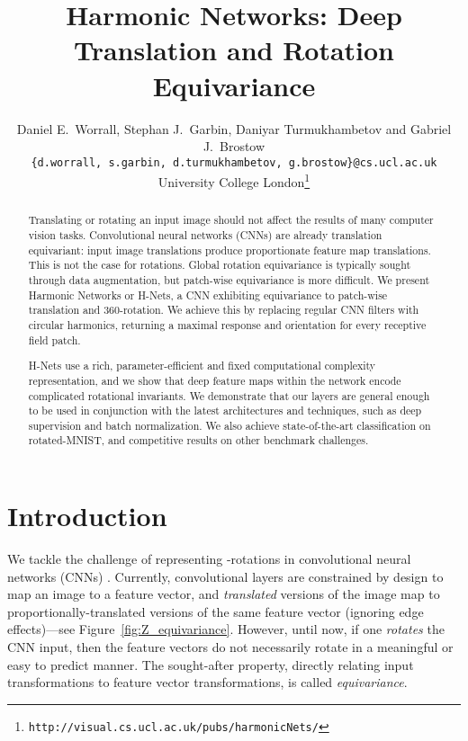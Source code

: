 \documentclass[10pt,twocolumn,letterpaper]{article}
\begin{document}
\title{Harmonic Networks: Deep Translation and Rotation Equivariance}

\author{Daniel E.~Worrall, Stephan J.~Garbin, Daniyar Turmukhambetov and Gabriel J.~Brostow \\
{\tt \small \{{d.worrall}, {s.garbin}, {d.turmukhambetov}, {g.brostow}\}{@cs.ucl.ac.uk}}\\
University College London\thanks{\texttt{http://visual.cs.ucl.ac.uk/pubs/harmonicNets/}}}


\maketitle


\begin{abstract}
	Translating or rotating an input image should not affect the results 
    of many computer vision tasks. Convolutional neural networks (CNNs) 
    are already translation equivariant: input image translations produce 
    proportionate feature map translations. This is not the case for 
    rotations. Global rotation equivariance is typically sought through 
    data augmentation, but patch-wise equivariance is more difficult. 
    We present Harmonic Networks or H-Nets, a CNN exhibiting equivariance 
    to patch-wise translation and 360-rotation. We achieve this by replacing 
    regular CNN filters with circular harmonics, returning a maximal 
    response and orientation for every receptive field patch.
    
    H-Nets use a rich, parameter-efficient and fixed computational complexity 
    representation, and we show that deep feature maps within the network 
    encode complicated rotational invariants. We demonstrate that our layers 
    are general enough to be used in conjunction with the latest architectures 
    and techniques, such as deep supervision and batch normalization. We also 
    achieve state-of-the-art classification on rotated-MNIST, and competitive 
    results on other benchmark challenges.
\end{abstract}



\section{Introduction}
We tackle the challenge of representing -rotations in convolutional neural networks (CNNs) \cite{lecun1995cnn}. Currently, convolutional layers are constrained by design to map an image to a feature vector, and \emph{translated} versions of the image map to proportionally-translated versions of the same feature vector \cite{lenc2015equivariance} (ignoring edge effects)---see Figure~\ref{fig:Z_equivariance}. However, until now, if one \emph{rotates} the CNN input, then the feature vectors do not necessarily rotate in a meaningful or easy to predict manner. The sought-after property, directly relating input transformations to feature vector transformations, is called \emph{equivariance}.
\end{document}
